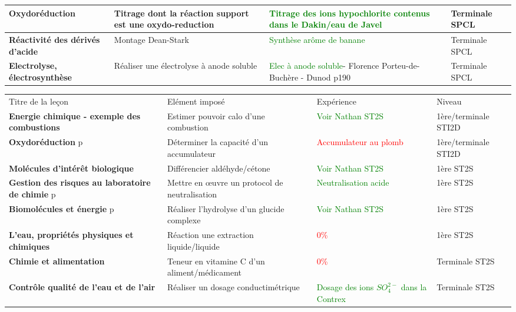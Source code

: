 \begin{changemargin}{-1.5cm}{0cm}
\begin{tabularx}{\paperwidth-2cm}{| X | X | X | X |}
  \hline
  \textbf{Oxydoréduction} & Titrage dont la réaction support est une oxydo-reduction & \textcolor{green}{Titrage des ions hypochlorite contenus dans le Dakin/eau de Javel}  & Terminale SPCL \\
  \hline
  \textbf{Réactivité des dérivés d'acide} & Montage Dean-Stark & \textcolor{green}{Synthèse arôme de banane}  & Terminale SPCL \\
  \hline
  \textbf{Electrolyse, électrosynthèse} & Réaliser une électrolyse à anode soluble & \textcolor{green}{Elec à anode soluble}- Florence Porteu-de-Buchère - Dunod p190 & Terminale SPCL \\
  \hline
\end{tabularx}
\end{changemargin}

\newpage

\begin{changemargin}{-1.5cm}{-0cm}
\begin{tabularx}{\paperwidth-2cm}{| X | X | X | X |}
  \hline
  \rowcolor{gray!20}\multicolumn{4}{c}{Avancement préparation oraux Leçons Chimie} \\
  \hline 
  Titre de la leçon & Elément imposé & Expérience & Niveau \\
  \hline
  \textbf{Energie chimique - exemple des combustions} & Estimer pouvoir calo d'une combustion & \textcolor{green}{Voir Nathan ST2S}  & 1ère/terminale STI2D \\
  \hline
  \textbf{Oxydoréduction} p\pageref{LC_Oxydoreduction_STI2D} & Déterminer la capacité d'un accumulateur & \textcolor{red}{Accumulateur au plomb}  & 1ère/terminale STI2D \\
   \hline  
  \hline
  \textbf{Molécules d'intérêt biologique} & Différencier aldéhyde/cétone & \textcolor{green}{Voir Nathan ST2S} & 1ère ST2S \\
  \hline
  \textbf{Gestion des risques au laboratoire de chimie} p\pageref{LC_GestionRisquesLabo} & Mettre en \oe uvre un protocol de neutralisation & \textcolor{green}{Neutralisation acide} & 1ère ST2S \\
  \hline
   \textbf{Biomolécules et énergie} p\pageref{LC_BiomoleculesEnergie} & Réaliser l'hydrolyse d'un glucide complexe & \textcolor{green}{Voir Nathan ST2S}  & 1ère ST2S \\
  \hline 
  \textbf{L'eau, propriétés physiques et chimiques} & Réaction une extraction liquide/liquide & \textcolor{red}{0\%} & 1ère ST2S \\
  \hline 
  \hline
  \textbf{Chimie et alimentation} & Teneur en vitamine C d'un aliment/médicament & \textcolor{red}{0\%} & Terminale ST2S \\
  \hline
  \textbf{Contrôle qualité de l'eau et de l'air} & Réaliser un dosage conductimétrique & \textcolor{green}{Dosage des ions $SO_4^{2-}$ dans la Contrex} & Terminale ST2S \\
  \hline
  \end{tabularx}
\end{changemargin}

